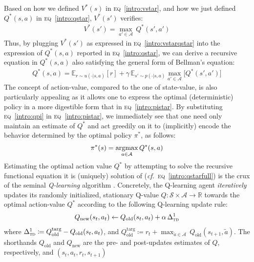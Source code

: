 Based on how we defined $V^*(s)$ in \textsc{eq}~\ref{intro:vstar},
and how we just defined $Q^*(s,a)$ in \textsc{eq}~\ref{intro:qstar}, $V^*(s')$ verifies:
\begin{align}
V^*(s')
= \max_{a' \in \mathcal{A}}
\, Q^*(s',a')
\label{intro:vstarqstar}
\end{align}
Thus, by plugging $V^*(s')$ as expressed in \textsc{eq}~\ref{intro:vstarqstar}
into the expression of $Q^*(s,a)$ reported in \textsc{eq}~\ref{intro:qstar},
we can derive a recursive equation in $Q^*(s,a)$ also satisfying the general form of Bellman's equation:
\begin{align}
Q^*(s,a)
= \mathbb{E}_{r \sim u(\cdot|s,a)}[r]
+ \gamma \,
\mathbb{E}_{s' \sim p(\cdot|s,a)}
\max_{a' \in \mathcal{A}}
\big[
Q^*(s',a')
\big]
\label{intro:qstarfull}
\end{align}
The concept of action-value, compared to the one of state-value,
is also particularly appealing as it allows one to express the optimal (deterministic) policy
in a more digestible form that in \textsc{eq}~\ref{intro:pistar}.
By substituting \textsc{eq}~\ref{intro:qpi} in \textsc{eq}~\ref{intro:pistar},
we immediately see that one need only maintain an estimate of $Q^*$
and act greedily on it to (implicitly) encode the behavior determined by the optimal policy $\pi^*$, as follows:
\begin{align}
\pi^*(s)
= \operatorname*{\arg\!\max}_{a \in \mathcal{A}}
Q^*(s,a)
\label{intro:pistarwithq}
\end{align}
Estimating the optimal action value $Q^*$ by attempting to solve the recursive functional equation
it is (uniquely) solution of (\textit{cf.}~\textsc{eq}~\ref{intro:qstarfull})
is the crux of the seminal \emph{Q-learning} algorithm \cite{Watkins1989-ir,Watkins1992-gl}.
Concretely, the Q-learning agent \emph{iteratively} updates its randomly initialized, stationary Q-value
$Q: \mathcal{S} \times \mathcal{A} \to \mathbb{R}$
towards the optimal action-value $Q^*$
according to the following Q-learning update rule:
\begin{align}
Q_\text{new}(s_t,a_t)
\leftarrow
Q_\text{old}(s_t,a_t) + \alpha \, \Delta_\textsc{td}^1
\label{intro:qlearning}
\end{align}
where
$\Delta_\textsc{td}^1 \coloneqq Q_\text{old}^\text{targ} - Q_\text{old}(s_t,a_t)$,
and
$Q_\text{old}^\text{targ} \coloneqq r_t + \max_{\tilde{a} \in \mathcal{A}} \, Q_\text{old}(s_{t+1},\tilde{a})$.
The shorthands $Q_\text{old}$ and $Q_\text{new}$ are the pre- and post-updates estimates of $Q$, respectively,
and $(s_t,a_t,r_t,s_{t+1})$
